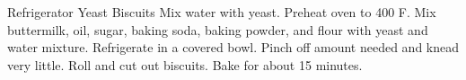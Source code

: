 \documentclass[../cookbook.tex]{subfiles}
\begin{document}
\begin{recipe}{Refrigerator Yeast Biscuits}{}{}
    Mix water with yeast.
    Preheat oven to 400\degrees{} F. Mix buttermilk, oil, sugar, baking
    soda, baking powder, and flour with yeast and water mixture.
    Refrigerate in a covered bowl. Pinch off amount needed and knead
    very little. Roll and cut out biscuits. Bake for about 15 minutes.
\end{recipe}
\end{document}
